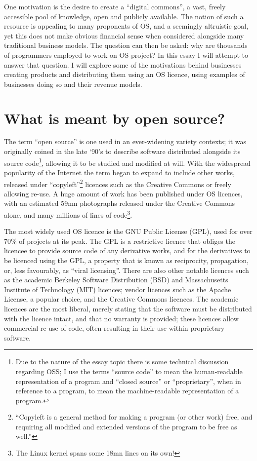 \documentclass[a4paper]{article}
\begin{document}
One motivation is the desire to create a “digital commons”, a vast, freely accessible pool of knowledge, open and publicly available. The notion of such a resource is appealing to many proponents of OS\cite{fsf}, and a seemingly altruistic goal, yet this does not make obvious financial sense when considered alongside many traditional business models. The question can then be asked: why are thousands of programmers employed to work on OS project\cite{ibmlinux}\cite{mozillacrisis}? In this essay I will attempt to answer that question. I will explore some of the motivations behind businesses creating products and distributing them using an OS licence, using examples of businesses doing so and their revenue models.

\section{What is meant by open source?}

The term “open source” is one used in an ever-widening variety contexts; it was originally coined in the late ‘90’s\cite{osihistory} to describe software distributed alongside its source code\footnote{Due to the nature of the essay topic there is some technical discussion regarding OSS; I use the terms “source code” to mean the human-readable representation of a program and “closed source” or “proprietary”, when in reference to a program, to mean the machine-readable representation of a program.}, allowing it to be studied and modified at will. With the widespread popularity of the Internet the term began to expand to include other works, released under “copyleft”\footnote{“Copyleft is a general method for making a program (or other work) free, and requiring all modified and extended versions of the program to be free as well.”\cite{copyleft}} licences such as the Creative Commons\cite{cc} or freely allowing re-use. A huge amount of work has been published under OS licences, with an estimated 59mn\cite{ccdir} photographs released under the Creative Commons alone, and many millions of lines of code\footnote{The Linux kernel spans some 18mn lines on its own!\cite{linuxkernel}}.

The most widely used OS licence is the GNU Public License (GPL), used for over 70\% of projects at its peak\cite{surveyosl}. The GPL is a restrictive licence that obliges the licencee to provide source code of any derivative works, and for the derivatives to be licenced using the GPL, a property that is known as reciprocity, propagation, or, less favourably, as “viral licensing”\cite{viral}. There are also other notable licences such as the academic Berkeley Software Distribution\cite{bsd} (BSD) and Massachusetts Institute of Technology\cite{mit} (MIT) licences; vendor licences such as the Apache License\cite{apache}, a popular choice\cite{oslicenseusage}, and the Creative Commons licences\cite{cc}. The academic licences are the most liberal, merely stating that the software must be distributed with the licence intact, and that no warranty is provided; these licences allow commercial re-use of code, often resulting in their use within proprietary software.
\end{document}
